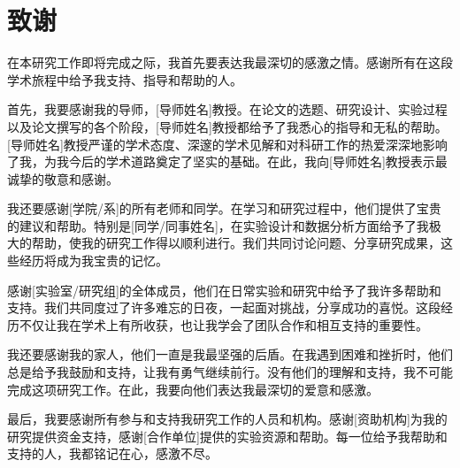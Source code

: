 \documentclass[a4paper,AutoFakeBold,oneside,12pt]{book}
\begin{document}
\blankmatter


\blankmatter




\frontmatter
\tableofcontents

\newpage
\mainmatter
{}





\clearpage
{}

\songti{}

\clearpage
\chapter*{致\qquad{}谢}

\normalsize

在本研究工作即将完成之际，我首先要表达我最深切的感激之情。感谢所有在这段学术旅程中给予我支持、指导和帮助的人。

首先，我要感谢我的导师，[导师姓名]教授。在论文的选题、研究设计、实验过程以及论文撰写的各个阶段，[导师姓名]教授都给予了我悉心的指导和无私的帮助。[导师姓名]教授严谨的学术态度、深邃的学术见解和对科研工作的热爱深深地影响了我，为我今后的学术道路奠定了坚实的基础。在此，我向[导师姓名]教授表示最诚挚的敬意和感谢。

我还要感谢[学院/系]的所有老师和同学。在学习和研究过程中，他们提供了宝贵的建议和帮助。特别是[同学/同事姓名]，在实验设计和数据分析方面给予了我极大的帮助，使我的研究工作得以顺利进行。我们共同讨论问题、分享研究成果，这些经历将成为我宝贵的记忆。

感谢[实验室/研究组]的全体成员，他们在日常实验和研究中给予了我许多帮助和支持。我们共同度过了许多难忘的日夜，一起面对挑战，分享成功的喜悦。这段经历不仅让我在学术上有所收获，也让我学会了团队合作和相互支持的重要性。

我还要感谢我的家人，他们一直是我最坚强的后盾。在我遇到困难和挫折时，他们总是给予我鼓励和支持，让我有勇气继续前行。没有他们的理解和支持，我不可能完成这项研究工作。在此，我要向他们表达我最深切的爱意和感激。

最后，我要感谢所有参与和支持我研究工作的人员和机构。感谢[资助机构]为我的研究提供资金支持，感谢[合作单位]提供的实验资源和帮助。每一位给予我帮助和支持的人，我都铭记在心，感激不尽。
\end{document}
